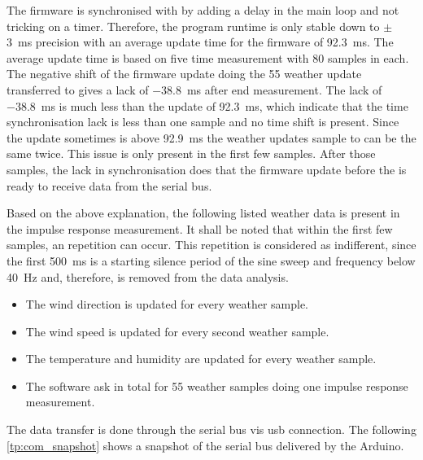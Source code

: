 The firmware is synchronised with \matlab by adding a delay in the main loop and not tricking on a timer. Therefore, the program runtime is only stable down to $\pm$ \SI{3}{\milli\second} precision with an average update time for the firmware of \SI{92.3}{\milli\second}. The average update time is based on five time measurement with 80 samples in each. The negative shift of the firmware update doing the 55 weather update transferred to \matlab gives a lack of \SI{-38.8}{\milli\second} after end measurement.  The lack of \SI{-38.8}{\milli\second} is much less than the update of \SI{92.3}{\milli\second}, which indicate that the time synchronisation lack is less than one sample and no time shift is present. Since the update sometimes is above \SI{92.9}{\milli\second} the weather updates sample to \matlab can be the same twice. This issue is only present in the first few samples. After those samples, the lack in synchronisation does that the firmware update before the \matlab is ready to receive data from the serial bus.

Based on the above explanation, the following listed weather data is present in the impulse response measurement. It shall be noted that within the first few samples, an repetition can occur. This repetition is considered as indifferent, since the first \SI{500}{\milli\second} is a starting silence period of the sine sweep and frequency below \SI{40}{\hertz} and, therefore, is removed from the data analysis. 

\begin{itemize}
\item The wind direction is updated for every weather sample.  
\item The wind speed is updated for every second weather sample.
\item The temperature and humidity are updated for every weather sample.
\item The \matlab software ask in total for 55 weather samples doing one impulse response measurement. 
\end{itemize}

The data transfer is done through the serial bus vis \gls{usb} connection. The following \autoref{tp:com_snapshot} shows a snapshot of the serial bus delivered by the Arduino.


